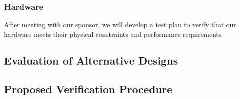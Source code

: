 \subsubsection{\label{sec:method:proposed-analysis:hardware}Hardware}
After meeting with our sponsor, we will develop a test plan to verify that our hardware meets their physical constraints and performance requirements.

\subsection{\label{sec:method:evaluation-of-alternative-designs}Evaluation of Alternative Designs}

\subsection{\label{sec:method:proposed-verification-procedure}Proposed Verification Procedure}